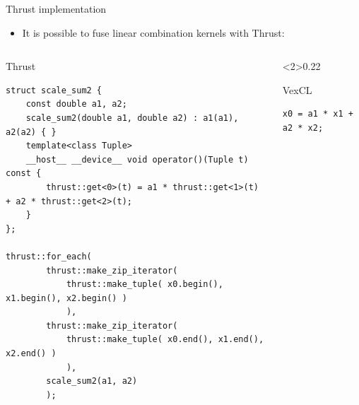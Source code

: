 \documentclass[@BEAMER_OPTIONS@]{beamer}
\begin{document}
\begin{frame}[fragile]{Thrust implementation}
    \begin{itemize}
        \item It is possible to fuse linear combination kernels with Thrust:
    \end{itemize}
    \begin{columns}
        \begin{column}{0.70\textwidth}
            \begin{exampleblock}{Thrust}
                \begin{adjustbox}{width=0.95\textwidth,height=0.6\textheight,keepaspectratio}
                    \begin{lstlisting}
struct scale_sum2 {
    const double a1, a2;
    scale_sum2(double a1, double a2) : a1(a1), a2(a2) { }
    template<class Tuple>
    __host__ __device__ void operator()(Tuple t) const {
        thrust::get<0>(t) = a1 * thrust::get<1>(t) + a2 * thrust::get<2>(t);
    }
};

thrust::for_each(
        thrust::make_zip_iterator(
            thrust::make_tuple( x0.begin(), x1.begin(), x2.begin() )
            ),
        thrust::make_zip_iterator(
            thrust::make_tuple( x0.end(), x1.end(), x2.end() )
            ),
        scale_sum2(a1, a2)
        );
                    \end{lstlisting}
                \end{adjustbox}
            \end{exampleblock}
        \end{column}
        \begin{column}<2>{0.22\textwidth}
            \begin{exampleblock}{VexCL}
                \begin{adjustbox}{width=0.95\textwidth,height=0.6\textheight,keepaspectratio}
                    \begin{lstlisting}
x0 = a1 * x1 + a2 * x2;
                    \end{lstlisting}
                \end{adjustbox}
            \end{exampleblock}
        \end{column}
    \end{columns}
\end{frame}

\note{ }
\end{document}
